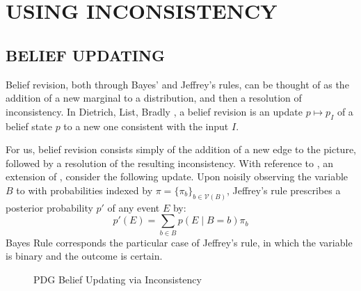 \documentclass{article}
\def\sheq{\!=\!}
\newcommand{\V}{\mathcal V}
\numberwithin{equation}{section}
\begin{document}
	

	\section{USING INCONSISTENCY}	
	\subsection{BELIEF UPDATING} \label{sec:belief-update}
	Belief revision, both through Bayes' and Jeffrey's rules, can be thought of as the addition of a new marginal to a distribution, and then a resolution of inconsistency. In Dietrich, List, Bradly \cite{dietrich2016belief}, a belief revision is an update $p \mapsto p_I$ of a belief state $p$ to a new one consistent with the input $I$. 
	
	For us, belief revision consists simply of the addition of a new edge to the picture, followed by a resolution of the resulting inconsistency. 
	With reference to , an extension of , consider the following update. 
	Upon noisily observing the variable $B$ to with probabilities indexed by $\pi = \{\pi_b\}_{b \in \V(B)}$, Jeffrey's rule prescribes a posterior probability $p'$ of any event $E$ by:
	\[ p'(E) = \sum_{b \in B} p(E \mid B\sheq b) \pi_b \]
	Bayes Rule corresponds the particular case of Jeffrey's rule, in which the variable is binary and the outcome is certain.

	
	\begin{figure}[h]
		\centering
%				
%				
		\caption{PDG Belief Updating via Inconsistency}
		\label{fig:belief-update}
	\end{figure}
	
\end{document}
